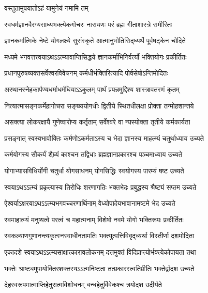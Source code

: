 
{वस्तुतामुपयातोऽहं यामुनेयं नमामि तम्}

\twolineshloka
{स्वधर्मज्ञानवैरग्यसाध्यभक्त्येकगोचरः}
{नारायणः परं ब्रह्म गीताशास्त्रे समीरितः}

\twolineshloka
{ज्ञानकर्मात्मिके नेष्टे योगलक्ष्ये सुसंस्कृते}
{आत्मानुभोतिसिद्‌ध्यर्थे पूर्वषट्केन चोदिते}

\twolineshloka
{मध्यमे भगवत्तत्त्वयाऽथऽऽत्म्यावाप्तिसिद्धये}
{ज्ञानकर्माभिनिर्वर्त्यो भक्तियोगः प्रकीर्तितः}

\twolineshloka
{प्रधानपुरुषव्यक्तसर्वेश्वरविवेचनम्}
{कर्मधीर्भक्तिरित्यादि पोर्वसेषोऽन्तिमोदितः}

\twolineshloka
{अस्थानस्नेहकार्पण्यधर्माधर्मधियाऽऽकुलम्}
{पार्थं प्रपन्नमुद्दिश्य शास्त्रावतरणं कृतम्}

\twolineshloka
{नित्यात्मासङ्गकर्मेहागोचरा सङ्ख्ययोगधीः}
{द्वितीये स्थितधीलक्षा प्रोक्ता तन्मोहशान्तये}

\twolineshloka
{असक्त्या लोकरक्षायै गुणेष्वारोप्य कर्तृताम्}
{सर्वेश्वरे वा न्यस्योक्ता तृतीये कर्मकार्यता}

\twolineshloka
{प्रसङ्गात् स्वस्वभावोक्तिः कर्मणोऽकर्मताऽस्य च}
{भेदा ज्ञानस्य माहत्म्यं चतुर्थाध्याय उच्यते}

\twolineshloka
{कर्मयोगस्य सौकर्यं शैघ्र्यं काश्चन तद्विधाः}
{ब्रह्मज्ञानप्रकारश्च पञ्चमाध्याय उच्यते}

\twolineshloka
{योगाभ्यासविधिर्योगी चतुर्धा योगसाधनम्}
{योगसिद्धिः स्वयोगस्य पारम्यं षष्ट उच्यते}

\twolineshloka
{स्वयाऽथऽऽत्म्यं प्रकृत्यास्य तिरोधिः शरणागतिः}
{भक्तभेदः प्रबुद्धस्य श्रैष्ट्यं सप्तम उच्यते}

\twolineshloka
{ऐश्वर्याऽक्षरयाऽथऽऽत्म्यभगवच्चरणार्थिनाम्}
{वेध्योपादेयभावानामष्टमे भेद उच्यते}

\twolineshloka
{स्वमाहात्म्यं मनुष्यत्वे परत्वं च महात्मनाम्}
{विशेषो नवमे योगो भक्तिरूपः प्रकीर्तितः}

\twolineshloka
{स्वकल्याणगुणानन्त्यकृत्स्नस्वाधीनतामतिः}
{भक्त्युत्पत्तिविवृद्‌ध्यर्था विस्तीर्णा दशमोदिता}

\twolineshloka
{एकादशे स्वयाऽथऽऽत्म्यसाक्षात्कारावलोकनम्}
{दत्तमुक्तं विदिप्राप्त्योर्भक्त्येकोपायता तथा}

\twolineshloka
{भक्तेः श्राष्ट्यमुपायोक्तिरशक्तस्यऽऽत्मनिष्टता}
{तत्प्रकारस्त्वतिप्रीतिः भक्तेर्द्वादश उच्यते}

\twolineshloka
{देहस्वरूपमात्माप्तिहेतुरात्मविशोधनम्}
{बन्धहेतुर्विवेकश्च त्रयोदश उदीर्यते}

